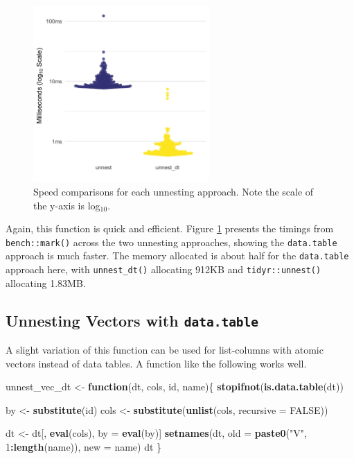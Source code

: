 \documentclass[doc,floatsintext]{apa6}
\newenvironment{Shaded}{\begin{snugshade}}{\end{snugshade}}
\newcommand{\ControlFlowTok}[1]{\textcolor[rgb]{0.13,0.29,0.53}{\textbf{#1}}}
\newcommand{\DataTypeTok}[1]{\textcolor[rgb]{0.13,0.29,0.53}{#1}}
\newcommand{\DecValTok}[1]{\textcolor[rgb]{0.00,0.00,0.81}{#1}}
\newcommand{\KeywordTok}[1]{\textcolor[rgb]{0.13,0.29,0.53}{\textbf{#1}}}
\newcommand{\NormalTok}[1]{#1}
\newcommand{\OperatorTok}[1]{\textcolor[rgb]{0.81,0.36,0.00}{\textbf{#1}}}
\newcommand{\OtherTok}[1]{\textcolor[rgb]{0.56,0.35,0.01}{#1}}
\newcommand{\StringTok}[1]{\textcolor[rgb]{0.31,0.60,0.02}{#1}}
\begin{document}
\begin{figure}[tb]
  \centering
  \includegraphics[width=0.6\textwidth]{timings_unnest_manuscript.png}
  \caption{Speed comparisons for each unnesting approach. Note the scale of the y-axis is log$_{10}$.}
  \label{speed2}
\end{figure}

Again, this function is quick and efficient. Figure \ref{speed2} presents the timings from \texttt{bench::mark()} across the two unnesting approaches, showing the \texttt{data.table} approach is much faster. The memory allocated is about half for the \texttt{data.table} approach here, with \texttt{unnest\_dt()} allocating 912KB and \texttt{tidyr::unnest()} allocating 1.83MB.

\hypertarget{unnesting-vectors-with-data.table}{%
\subsection{\texorpdfstring{Unnesting Vectors with \texttt{data.table}}{Unnesting Vectors with data.table}}\label{unnesting-vectors-with-data.table}}

A slight variation of this function can be used for list-columns with atomic vectors instead of data tables. A function like the following works well.

\begin{Shaded}
\begin{Highlighting}[]
\NormalTok{unnest_vec_dt <-}\StringTok{ }\ControlFlowTok{function}\NormalTok{(dt, cols, id, name)\{}
  \KeywordTok{stopifnot}\NormalTok{(}\KeywordTok{is.data.table}\NormalTok{(dt))}
  
\NormalTok{  by <-}\StringTok{ }\KeywordTok{substitute}\NormalTok{(id)}
\NormalTok{  cols <-}\StringTok{ }\KeywordTok{substitute}\NormalTok{(}\KeywordTok{unlist}\NormalTok{(cols, }
                            \DataTypeTok{recursive =} \OtherTok{FALSE}\NormalTok{))}
  
\NormalTok{  dt <-}\StringTok{ }\NormalTok{dt[, }\KeywordTok{eval}\NormalTok{(cols), by =}\StringTok{ }\KeywordTok{eval}\NormalTok{(by)]}
  \KeywordTok{setnames}\NormalTok{(dt, }\DataTypeTok{old =} \KeywordTok{paste0}\NormalTok{(}\StringTok{"V"}\NormalTok{, }\DecValTok{1}\OperatorTok{:}\KeywordTok{length}\NormalTok{(name)), }\DataTypeTok{new =}\NormalTok{ name)}
\NormalTok{  dt}
\NormalTok{\}}
\end{Highlighting}
\end{Shaded}
\end{document}
